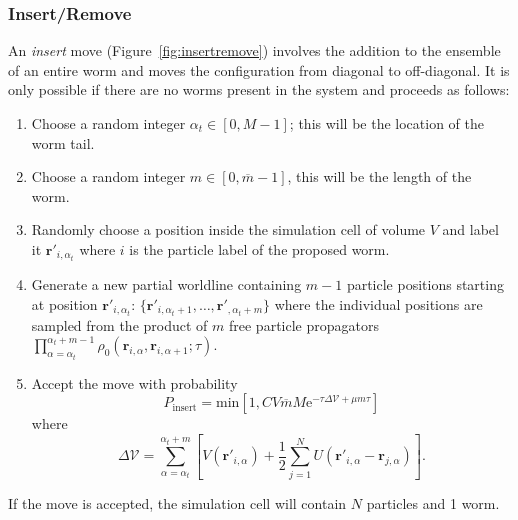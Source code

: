 \documentclass[prb,aps,amssym,nofootinbib,floatfix,notitlepage]{revtex4-1}
\renewcommand{\vec}[1]{\boldsymbol{#1}}
\newcommand{\e}[1]{\mathrm{e}^{#1}}
\begin{document}
\subsubsection{Insert/Remove}
 An \emph{insert} move (Figure~\ref{fig:insertremove}) involves the addition to
 the ensemble of an entire worm and moves the configuration from diagonal to
 off-diagonal.  It is only possible if there are no worms present in the system
 and proceeds as follows:
\begin{enumerate}
    \item Choose a random integer $\alpha_t \in [0,M-1]$; this will be the
        location of the worm tail.
    \item Choose a random integer $m \in [0,\overline{m}-1]$, this will be the
        length of the worm.
    \item Randomly choose a position inside the simulation cell of volume $V$
        and label it $\vec{r}'_{i,\alpha_t}$ where $i$ is the particle label of
        the proposed worm.
    \item Generate a new partial worldline containing $m-1$ particle positions
        starting at position $\vec{r}'_{i,\alpha_t}$: $\{\vec{r}'_{i,\alpha_t+1},\ldots,
    \vec{r}'_{,\alpha_t+m}\}$ where the individual positions are sampled from
    the product of $m$ free particle propagators
    $\prod_{\alpha=\alpha_t}^{\alpha_t+m-1}
    \rho_0(\vec{r}_{i,\alpha},\vec{r}_{i,\alpha+1};\tau)$.
\item Accept the move with probability
\begin{equation}
    P_{\text{insert}} = \mathrm{min} \left[1,
C V \overline{m}M \e{-\tau \Delta \mathcal{V} + \mu m \tau} \right]
\end{equation}
%
where
%
\begin{equation}
    \Delta\mathcal{V} = \sum_{\alpha=\alpha_t}^{\alpha_t+m} \left[ 
        V(\vec{r}'_{i,\alpha}) + \frac{1}{2}\sum_{j=1}^N
        U(\vec{r}'_{i,\alpha}-\vec{r}_{j,\alpha}) \right].
\end{equation}
%
\end{enumerate}
If the move is accepted, the simulation cell will contain $N$ particles and 1
worm.\\[2ex]
%
\end{document}
